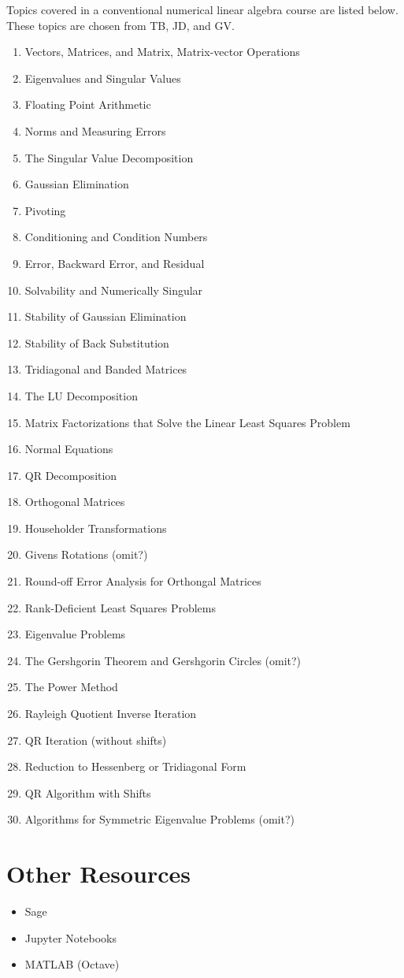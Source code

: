 \documentclass[12pt]{article}
\begin{document}
Topics covered in a conventional numerical linear algebra course are listed below. These topics are chosen from TB, JD, and GV.

\begin{enumerate}
	\item Vectors, Matrices, and Matrix, Matrix-vector Operations
	\item Eigenvalues and Singular Values
	\item Floating Point Arithmetic
	\item Norms and Measuring Errors
	\item The Singular Value Decomposition
	\item Gaussian Elimination
	\item Pivoting
	\item Conditioning and Condition Numbers
	\item Error, Backward Error, and Residual
	\item Solvability and Numerically Singular
	\item Stability of Gaussian Elimination
	\item Stability of Back Substitution
	\item Tridiagonal and Banded Matrices
	\item The LU Decomposition
	\item Matrix Factorizations that Solve the Linear Least Squares Problem
	\item Normal Equations
	\item QR Decomposition
	\item Orthogonal Matrices
	\item Householder Transformations
	\item Givens Rotations (omit?)
	\item Round-off Error Analysis for Orthongal Matrices
	\item Rank-Deficient Least Squares Problems
	\item Eigenvalue Problems
	\item The Gershgorin Theorem and Gershgorin Circles (omit?)
	\item The Power Method
	\item Rayleigh Quotient Inverse Iteration
	\item QR Iteration (without shifts)
	\item Reduction to Hessenberg or Tridiagonal Form
	\item QR Algorithm with Shifts
	\item Algorithms for Symmetric Eigenvalue Problems (omit?)
\end{enumerate}

\section{Other Resources}

\begin{itemize}
	\item Sage
	\item Jupyter Notebooks
	\item MATLAB (Octave)
\end{itemize}
\end{document}
